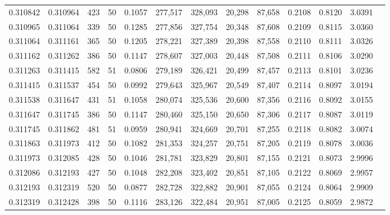 \begin{tabular}{rrrrrrrrrrrrr}
0.310842 & 0.310964 &   423 &  50 &                                     0.1057 & 277,517 & 328,093 &  20,298 &  87,658 & 0.2108 & 0.8120 & 3.0391 \\
0.310965 & 0.311064 &   339 &  50 &                                     0.1285 & 277,856 & 327,754 &  20,348 &  87,608 & 0.2109 & 0.8115 & 3.0360 \\
0.311064 & 0.311161 &   365 &  50 &                                     0.1205 & 278,221 & 327,389 &  20,398 &  87,558 & 0.2110 & 0.8111 & 3.0326 \\
0.311162 & 0.311262 &   386 &  50 &                                     0.1147 & 278,607 & 327,003 &  20,448 &  87,508 & 0.2111 & 0.8106 & 3.0290 \\
0.311263 & 0.311415 &   582 &  51 &                                     0.0806 & 279,189 & 326,421 &  20,499 &  87,457 & 0.2113 & 0.8101 & 3.0236 \\
0.311415 & 0.311537 &   454 &  50 &                                     0.0992 & 279,643 & 325,967 &  20,549 &  87,407 & 0.2114 & 0.8097 & 3.0194 \\
0.311538 & 0.311647 &   431 &  51 &                                     0.1058 & 280,074 & 325,536 &  20,600 &  87,356 & 0.2116 & 0.8092 & 3.0155 \\
0.311647 & 0.311745 &   386 &  50 &                                     0.1147 & 280,460 & 325,150 &  20,650 &  87,306 & 0.2117 & 0.8087 & 3.0119 \\
0.311745 & 0.311862 &   481 &  51 &                                     0.0959 & 280,941 & 324,669 &  20,701 &  87,255 & 0.2118 & 0.8082 & 3.0074 \\
0.311863 & 0.311973 &   412 &  50 &                                     0.1082 & 281,353 & 324,257 &  20,751 &  87,205 & 0.2119 & 0.8078 & 3.0036 \\
0.311973 & 0.312085 &   428 &  50 &                                     0.1046 & 281,781 & 323,829 &  20,801 &  87,155 & 0.2121 & 0.8073 & 2.9996 \\
0.312086 & 0.312193 &   427 &  50 &                                     0.1048 & 282,208 & 323,402 &  20,851 &  87,105 & 0.2122 & 0.8069 & 2.9957 \\
0.312193 & 0.312319 &   520 &  50 &                                     0.0877 & 282,728 & 322,882 &  20,901 &  87,055 & 0.2124 & 0.8064 & 2.9909 \\
0.312319 & 0.312428 &   398 &  50 &                                     0.1116 & 283,126 & 322,484 &  20,951 &  87,005 & 0.2125 & 0.8059 & 2.9872 \\

\end{tabular}
